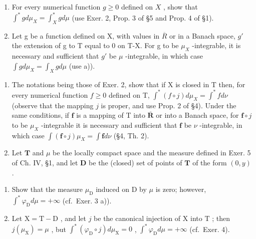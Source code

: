 \begin{enumerate}
\def\labelenumi{\alph{enumi})}
\item
  For every numerical function \(g \geqslant 0\) defined on \(X\) , show that \(\int^{*} g d\mu_{X} = \int_{X}^{*} g d\mu\) (use Exer. 2, Prop. 3 of §5 and Prop. 4 of §1).
\item
  Let g be a function defined on X, with values in \(\overline{R}\) or in a Banach space, \(g'\) the extension of g to T equal to 0 on T-X. For g to be \(\mu_{X}\) -integrable, it is necessary and sufficient that \(g'\) be \(\mu\) -integrable, in which case \(\int g d\mu_{X} = \int_{X} g d\mu\) (use a)).
\end{enumerate}

\begin{enumerate}
\def\labelenumi{\arabic{enumi})}
\setcounter{enumi}{3}
\item
  The notations being those of Exer. 2, show that if X is closed in T then, for every numerical function \(f \geqslant 0\) defined on T, \(\int^{*}(f \circ j) d\mu_{X} = \int^{*} f d\nu\) (observe that the mapping \(j\) is proper, and use Prop. 2 of §4). Under the same conditions, if \(\mathbf{f}\) is a mapping of T into \(\overline{\mathbf{R}}\) or into a Banach space, for \(\mathbf{f} \circ j\) to be \(\mu_{X}\) -integrable it is necessary and sufficient that \(\mathbf{f}\) be \(\nu\) -integrable, in which case \(\int(\mathbf{f} \circ j)\mu_{X} = \int \mathbf{f} d\nu\) (§4, Th. 2).
\item
  Let \(\mathbf{T}\) and \(\mu\) be the locally compact space and the measure defined in Exer. 5 of Ch. IV, §1, and let \(\mathbf{D}\) be the (closed) set of points of \(\mathbf{T}\) of the form \((0,y)\) .
\end{enumerate}

\begin{enumerate}
\def\labelenumi{\alph{enumi})}
\item
  Show that the measure \(\mu_{\mathrm{D}}\) induced on D by \(\mu\) is zero; however, \(\int^{*}\varphi_{\mathrm{D}}d\mu = +\infty\) (cf.~Exer. 3 a)).
\item
  Let \(\mathrm{X} = \mathrm{T} - \mathrm{D}\) , and let \(j\) be the canonical injection of \(\mathrm{X}\) into \(\mathrm{T}\) ; then \(j(\mu_{\mathrm{X}}) = \mu\) , but \(\int^{*} (\varphi_{\mathrm{D}} \circ j) d\mu_{\mathrm{X}} = 0\) , \(\int^{*} \varphi_{\mathrm{D}} d\mu = +\infty\) (cf.~Exer. 4).
\end{enumerate}

